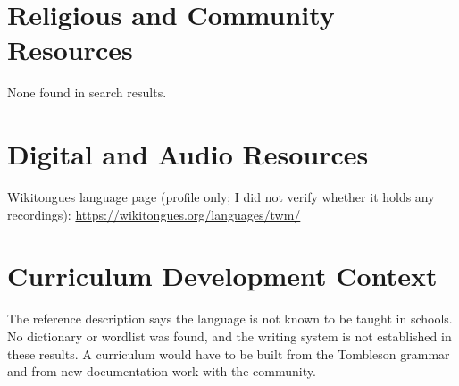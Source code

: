 \documentclass[12pt]{article}
\begin{document}
\section{Religious and Community Resources}
None found in search results.

\section{Digital and Audio Resources}
Wikitongues language page (profile only; I did not verify whether it holds any recordings): \url{https://wikitongues.org/languages/twm/}

\section{Curriculum Development Context}
The reference description says the language is not known to be taught in schools. No dictionary or wordlist was found, and the writing system is not established in these results. A curriculum would have to be built from the Tombleson grammar and from new documentation work with the community.
\end{document}
